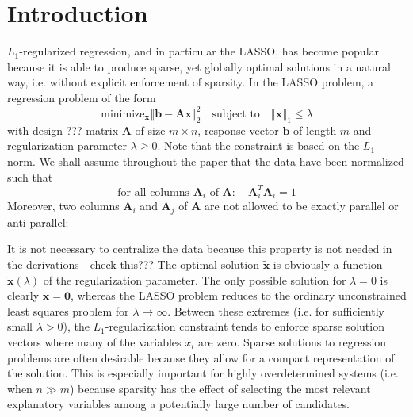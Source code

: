 \section{Introduction}



$L_{1}$-regularized regression, and in particular the LASSO, has
become popular because it is able to produce sparse, yet globally
optimal solutions in a natural way, i.e. without explicit enforcement
of sparsity. In the LASSO problem, a regression problem of the form
\begin{equation}
\textrm{minimize}_{\mathbf{x}}\left\Vert \mathbf{b}-\mathbf{Ax}\right\Vert _{2}^{2}\quad\textrm{subject to}\quad\left\Vert \mathbf{x}\right\Vert _{1}\le\lambda\label{eq:lasso-problem}
\end{equation}
with design ??? matrix $\mathbf{A}$ of size $m\times n$, response
vector $\mathbf{b}$ of length $m$ and regularization parameter $\lambda\ge0$.
Note that the constraint is based on the $L_{1}$-norm. We shall assume
throughout the paper that the data have been normalized such that
\begin{equation}
\textrm{for all columns }\mathbf{A}_{i}\mbox{ of }\mathbf{A}:\quad\mathbf{A}_{i}^{T}\mathbf{A}_{i}=1\label{eq:normalization}
\end{equation}
Moreover, two columns $\mathbf{A}_{i}$ and $\mathbf{A}_{j}$ of $\mathbf{A}$
are not allowed to be exactly parallel or anti-parallel:


It is not necessary to centralize the data because this property is
not needed in the derivations - check this??? The optimal solution
$\tilde{\mathbf{x}}$ is obviously a function $\tilde{\mathbf{x}}\left(\lambda\right)$
of the regularization parameter. The only possible solution for $\lambda=0$
is clearly $\mathbf{\tilde{x}}=\mathbf{0}$, whereas the LASSO problem
reduces to the ordinary unconstrained least squares problem for $\lambda\rightarrow\infty$.
Between these extremes (i.e. for sufficiently small $\lambda>0$),
the $L_{1}$-regularization constraint tends to enforce sparse solution
vectors where many of the variables $\tilde{x}_{i}$ are zero. Sparse
solutions to regression problems are often desirable because they
allow for a compact representation of the solution. This is especially
important for highly overdetermined systems (i.e. when $n\gg m$)
because sparsity has the effect of selecting the most relevant explanatory
variables among a potentially large number of candidates. 


